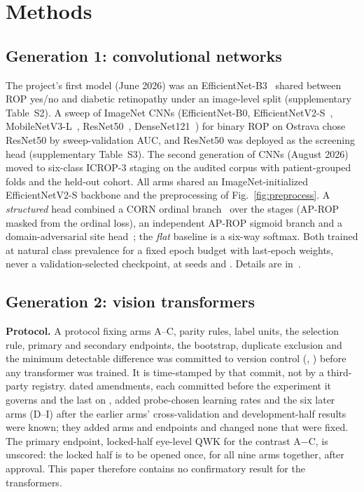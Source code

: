 \documentclass[journal]{IEEEtran}
\begin{document}
\section{Methods}\label{sec:methods}
\subsection{Generation 1: convolutional networks}\label{sec:cnn}
The project's first model (June 2026) was an EfficientNet-B3~\cite{tan2019} shared between ROP yes/no and diabetic retinopathy under an image-level split (supplementary Table~S2). A sweep of \sweepArchs{} ImageNet CNNs (EfficientNet-B0, EfficientNetV2-S~\cite{tan2021}, MobileNetV3-L~\cite{howard2019}, ResNet50~\cite{he2016}, DenseNet121~\cite{huang2017}) for binary ROP on Ostrava chose ResNet50 by sweep-validation AUC, and ResNet50 was deployed as the screening head (supplementary Table~S3). The second generation of CNNs (August 2026) moved to six-class ICROP-3 staging on the audited corpus with patient-grouped folds and the held-out cohort. All arms shared an ImageNet-initialized EfficientNetV2-S backbone and the preprocessing of Fig.~\ref{fig:preprocess}. A \emph{structured} head combined a CORN ordinal branch~\cite{corn2023} over the stages (AP-ROP masked from the ordinal loss), an independent AP-ROP sigmoid branch and a domain-adversarial site head~\cite{ganin2016}; the \emph{flat} baseline is a six-way softmax. Both trained at natural class prevalence for a fixed epoch budget with last-epoch weights, never a validation-selected checkpoint, at seeds \seedA{} and \seedB{}. Details are in~\cite{nagpure2026}.

\subsection{Generation 2: vision transformers}\label{sec:vit}
\textbf{Protocol.} A protocol fixing arms A--C, parity rules, label units, the selection rule, primary and secondary endpoints, the bootstrap, duplicate exclusion and the minimum detectable difference was committed to version control (\texttt{\protoCommit}, \protoDate{}) before any transformer was trained. It is time-stamped by that commit, not by a third-party registry. \nAmend{} dated amendments, each committed before the experiment it governs and the last on \lastAmendDate{}, added probe-chosen learning rates and the six later arms (D--I) after the earlier arms' cross-validation and development-half results were known; they added arms and endpoints and changed none that were fixed. The primary endpoint, locked-half eye-level QWK for the contrast A$-$C, is unscored: the locked half is to be opened once, for all nine arms together, after approval. This paper therefore contains no confirmatory result for the transformers.
\end{document}
